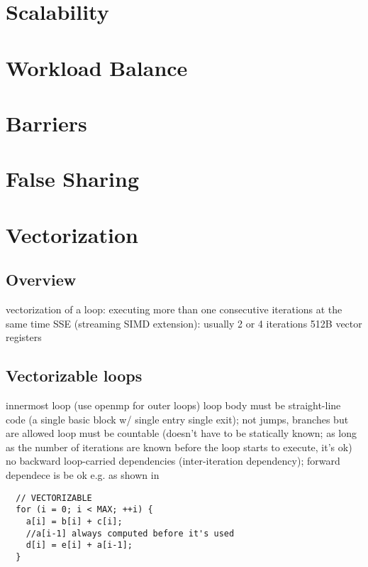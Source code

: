 \documentclass{myproc}
\begin{document}
\small
{}

\tableofcontents

\section{Scalability}

\section{Workload Balance}

\section{Barriers}

\section{False Sharing}

\section{Vectorization}
\subsection{Overview}
\bit
\w vectorization of a loop: executing more than one consecutive iterations at
the same time
  \bit
  \w SSE (streaming SIMD extension): usually 2 or 4 iterations
  \eit
\w 512B vector registers
\eit

\subsection{Vectorizable loops}
\bit
\w innermost loop (use openmp for outer loops)
\w loop body must be straight-line code (a single basic block w/ single entry
single exit); not jumps, branches but  are allowed
\w loop must be countable (doesn't have to be statically known; as long as the
number of iterations are known before the loop starts to execute, it's ok)
\w no backward loop-carried dependencies (inter-iteration dependency); forward
dependece is be ok e.g. as shown in
  \begin{verbatim}  
  // VECTORIZABLE
  for (i = 0; i < MAX; ++i) {
    a[i] = b[i] + c[i];
    //a[i-1] always computed before it's used
    d[i] = e[i] + a[i-1];
  }
  \end{verbatim}
   
\end{document}
